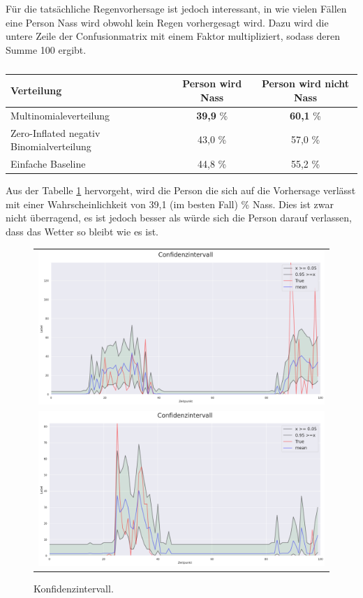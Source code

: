 \noindent Für die tatsächliche Regenvorhersage ist jedoch interessant, in wie vielen Fällen eine Person Nass wird obwohl kein Regen vorhergesagt wird.
Dazu wird die untere Zeile der Confusionmatrix mit einem Faktor multipliziert, sodass deren Summe 100 ergibt.\\
\begin{table}[h]
\begin{tabular}[h]{l|c|c}
Verteilung & Person wird Nass & Person wird nicht Nass  \\
\hline
Multinomialeverteilung & \textbf{39,9} \% & \textbf{60,1} \%  \\
Zero-Inflated negativ Binomialverteilung &43,0 \% & 57,0 \%  \\
Einfache Baseline & 44,8 \% & 55,2 \% 
\end{tabular}
\caption{\label{tab:nass}}
\end{table}

\noindent Aus der Tabelle \ref{tab:nass} hervorgeht, wird die Person die sich auf die Vorhersage verlässt mit einer Wahrscheinlichkeit von 39,1 (im besten Fall) \% Nass.
Dies ist zwar nicht überragend, es ist jedoch besser als würde sich die Person darauf verlassen, dass das Wetter so bleibt wie es ist.

\begin{figure}[h]
\centering
\begin{tabular}{c}
\includegraphics[width=120mm]{abb/quantile_LSTM.png}\\
\includegraphics[width=120mm]{abb/quantile_UNET.png}
\end{tabular}
\caption{Konfidenzintervall. \label{fig:quantiles}}
\end{figure}


